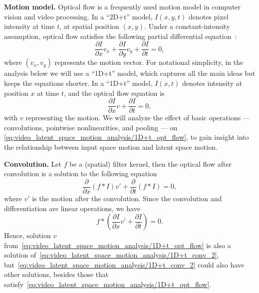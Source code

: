 \textbf{Motion model.} Optical flow is a frequently used motion model in computer vision and video processing. In a ``2D+t'' model, $I(x,y,t)$ denotes pixel intensity at time $t$, at spatial position $(x,y)$. Under a constant-intensity assumption,  optical flow satisfies the following partial differential equation~\cite{Horn_Schunk_1981}:
\begin{equation}
    \frac{\partial I}{\partial x}v_x + \frac{\partial I}{\partial y}v_y + \frac{\partial I}{\partial t} = 0,
    \label{eq:video_latent_space_motion_analysis/2D+t_opt_flow}
\end{equation}
where $(v_x,v_y)$ represents the motion vector. For notational simplicity, in the analysis below we will use a ``1D+t'' model, which captures all the main ideas but keeps the equations shorter. In a ``1D+t'' model, $I(x,t)$ denotes intensity at position $x$ at time $t$, and the optical flow equation is
\begin{equation}
    \frac{\partial I}{\partial x}v  + \frac{\partial I}{\partial t} = 0,
    \label{eq:video_latent_space_motion_analysis/1D+t_opt_flow}
\end{equation}
with $v$ representing the motion.
We will analyze the effect of basic operations --- convolutions, pointwise nonlinearities, and pooling --- on \cref{eq:video_latent_space_motion_analysis/1D+t_opt_flow}, to gain insight into the relationship between input space motion and latent space motion.

\textbf{Convolution.} Let $f$ be a (spatial) filter kernel, then the optical flow after convolution is a solution to the following equation
\begin{equation}
    \frac{\partial}{\partial x}(f*I)v'  + \frac{\partial}{\partial t}(f*I) = 0,
    \label{eq:video_latent_space_motion_analysis/1D+t_conv}
\end{equation}
where $v'$ is the motion after the convolution. Since the convolution and differentiation are linear operations, we have
\begin{equation}
    f*\left(\frac{\partial I}{\partial x}v'  + \frac{\partial I}{\partial t} \right) = 0.
    \label{eq:video_latent_space_motion_analysis/1D+t_conv_2}
\end{equation}
Hence, solution $v$ from~\cref{eq:video_latent_space_motion_analysis/1D+t_opt_flow} is also a solution of~\cref{eq:video_latent_space_motion_analysis/1D+t_conv_2}, but~\cref{eq:video_latent_space_motion_analysis/1D+t_conv_2} could also have other solutions, besides those that satisfy~\cref{eq:video_latent_space_motion_analysis/1D+t_opt_flow}.

